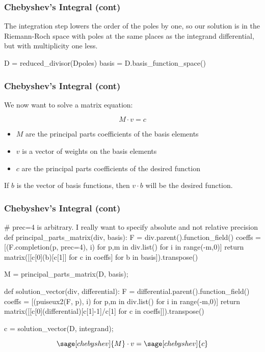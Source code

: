 \documentclass[aspectratio=169,dvipsnames]{beamer}
\begin{document}
\begin{frame}[fragile]
\frametitle{Chebyshev's Integral (cont)}

The integration step lowers the order of the poles by one, so our
solution is in the Riemann-Roch space with poles at the same places as
the integrand differential, but with multiplicity one less.

\begin{sageblock}[chebyshev]
D = reduced_divisor(Dpoles)
basis = D.basis_function_space()
\end{sageblock}

\end{frame}

\begin{frame}[fragile]
\frametitle{Chebyshev's Integral (cont)}

We now want to solve a matrix equation:

$$M \cdot v = c$$

\begin{itemize}
\item $M$ are the principal parts coefficients of the basis elements
\item $v$ is a vector of weights on the basis elements
\item $c$ are the principal parts coefficients of the desired function
\end{itemize}

If $b$ is the vector of basis functions, then $v\cdot b$ will be the desired function.

\end{frame}

\begin{frame}[fragile]
\frametitle{Chebyshev's Integral (cont)}

\begin{sageblock}[chebyshev]
# prec=4 is arbitrary.  I really want to specify absolute and not relative precision
def principal_parts_matrix(div, basis):
    F = div.parent().function_field()
    coeffs = [(F.completion(p, prec=4), i) for p,m in div.list() for i in range(-m,0)]
    return matrix([[c[0](b)[c[1]] for c in coeffs] for b in basis]).transpose()

M = principal_parts_matrix(D, basis);

def solution_vector(div, differential):
    F = differential.parent().function_field()
    coeffs = [(puiseux2(F, p), i) for p,m in div.list() for i in range(-m,0)]
    return matrix([[c[0](differential)[c[1]-1]/c[1] for c in coeffs]]).transpose()

c = solution_vector(D, integrand);
\end{sageblock}

\bigskip
\tiny
\[ \sage[chebyshev]{M} \cdot v = \sage[chebyshev]{c} \]

\end{frame}
\end{document}
